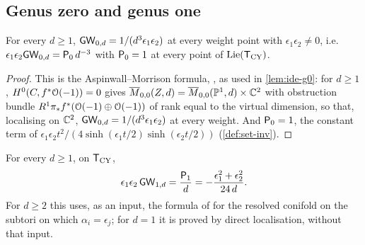 \subsection{Genus zero and genus one}

\begin{prop}
\label{prop:rig-g0}
For every $d\geq1$, $\mathsf{GW}_{0,d}=1/(d^3\epsilon_1\epsilon_2)$ at every weight point with $\epsilon_1\epsilon_2\neq0$, i.e.\ $\epsilon_1\epsilon_2\mathsf{GW}_{0,d}=\mathsf{P}_{0}\,d^{-3}$ with $\mathsf{P}_{0}=1$ at every point of $\mathrm{Lie}(\mathsf{T}_{\mathrm{CY}})$.
\end{prop}

\begin{proof}
This is the Aspinwall--Morrison formula, \cite[p.~3]{FP00}, as used in \cref{lem:ide-g0}: for $d\geq 1$, $H^0(C,f^*\mathcal{O}(-1))=0$ gives $\overline{M}_{0,0}(Z,d)=\overline{M}_{0,0}(\mathbb{P}^1,d)\times\mathbb{C}^2$ with obstruction bundle $R^1\pi_*f^*(\mathcal{O}(-1)\oplus\mathcal{O}(-1))$ of rank equal to the virtual dimension, so that, localising on $\mathbb{C}^2$, $\mathsf{GW}_{0,d}=1/(d^3\epsilon_1\epsilon_2)$ at every weight. And $\mathsf{P}_{0}=1$, the constant term of $\epsilon_1\epsilon_2t^2/(4\sinh(\epsilon_1t/2)\sinh(\epsilon_2t/2))$ (\cref{def:set-inv}).
\end{proof}

\begin{lem}
\label{lem:rig-g1}
For every $d\geq 1$, on $\mathsf{T}_{\mathrm{CY}}$,
\[
\epsilon_1\epsilon_2\,\mathsf{GW}_{1,d}=\frac{\mathsf{P}_{1}}{d}=-\frac{\epsilon_1^2+\epsilon_2^2}{24\,d}.
\]
For $d\geq 2$ this uses, as an input, the formula of \cite{BS} for the resolved conifold on the subtori on which $\alpha_i=\epsilon_j$; for $d=1$ it is proved by direct localisation, without that input. 
\end{lem}

